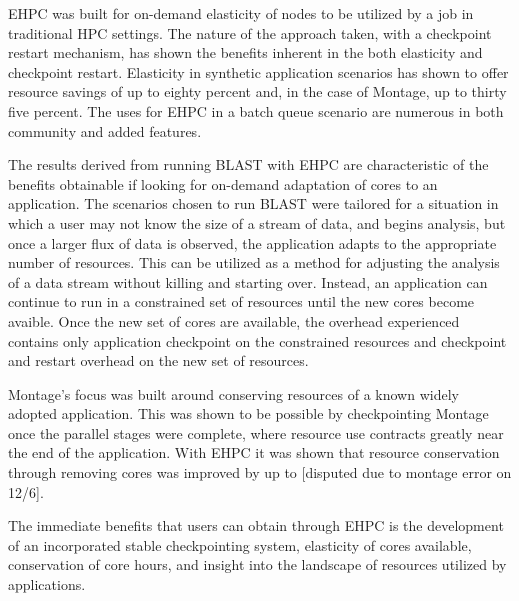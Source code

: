 EHPC was built for on-demand elasticity of nodes to be utilized by a job in traditional HPC settings. The nature of the approach taken, with a checkpoint restart mechanism, has shown the benefits inherent in the both elasticity and checkpoint restart. Elasticity in synthetic application scenarios has shown to offer resource savings of up to eighty percent and, in the case of Montage, up to thirty five percent. The uses for EHPC in a batch queue scenario are numerous in both community and added features. 

The results derived from running BLAST with EHPC are characteristic of the benefits obtainable if looking for on-demand adaptation of cores to an application. The scenarios chosen to run BLAST were tailored for a situation in which a user may not know the size of a stream of data, and begins analysis, but once a larger flux of data is observed, the application adapts to the appropriate number of resources.  This can be utilized as a method for adjusting the analysis of a data stream without killing and starting over.  Instead, an application can continue to run in a constrained set of resources until the new cores become avaible.  Once the new set of cores are available, the overhead experienced contains only application checkpoint on the constrained resources and checkpoint and restart overhead on the new set of resources. 

Montage's focus was built around conserving resources of a known widely adopted application. This was shown to be possible by checkpointing Montage once the parallel stages were complete, where resource use contracts greatly near the end of the application.  With EHPC it was shown that resource conservation through removing cores was improved by up to [disputed due to montage error on 12/6].

The immediate benefits that users can obtain through EHPC is the development of an incorporated stable checkpointing system, elasticity of cores available, conservation of core hours, and insight into the landscape of resources utilized by applications. 
